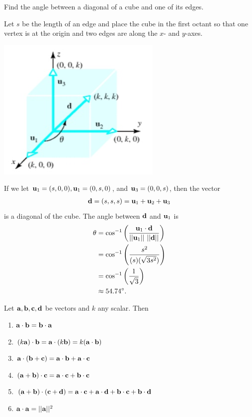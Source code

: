 \documentclass[12pt,letterpaper,reqno]{article}
\numberwithin{equation}{section}
\begin{document}
\begin{example}
	Find the angle between a diagonal of a cube and one of its edges.
\end{example}

{\color{red} 
Let $s$ be the length of an edge and place the cube in the first octant so that one vertex is at the origin and two edges are along the $x$- and $y$-axes.
\begin{center}
	\includegraphics[scale=0.5]{figures_mvc/cube_coordinates}
\end{center}
If we let ${\bf u}_1=(s,0,0), {\bf u}_1=(0,s,0)$, and ${\bf u}_3=(0,0,s)$, then the vector
\begin{align*}
	{\bf d}=(s,s,s)={\bf u}_1+{\bf u}_2+{\bf u}_3
\end{align*}
is a diagonal of the cube. The angle between ${\bf d}$ and ${\bf u}_1$ is 
\begin{align*}
	\theta &=\cos^{-1}\left(\frac{{\bf u}_1 \cdot {\bf d}}{||{\bf u}_1 || \ || {\bf d}||}\right) \\
	&=\cos^{-1}\left(\frac{s^2}{(s)(\sqrt{3s^2})}\right)  \\
	&=\cos^{-1}\left(\frac{1}{\sqrt{3}}\right) \\
	&\approx 54.74^\circ.
\end{align*}
}
\newpage
\begin{prop}\label{prop:dot}
	Let ${\bf a}, {\bf b}, {\bf c}, {\bf d}$ be vectors and $k$ any scalar. Then 
	\begin{enumerate}[(1)]
		\item ${\bf a}\cdot {\bf b}={\bf b} \cdot {\bf a}$
		\item $(k {\bf a})\cdot {\bf b}={\bf a}\cdot (k{\bf b})=k({\bf a}\cdot {\bf b})$
		\item ${\bf a}\cdot ({\bf b}+{\bf c})={\bf a}\cdot {\bf b}+{\bf a}\cdot {\bf c}$
		\item $({\bf a}+{\bf b})\cdot {\bf c}={\bf a}\cdot {\bf c}+{\bf b}\cdot {\bf c}$
		\item $({\bf a}+{\bf b})\cdot ({\bf c}+{\bf d})={\bf a}\cdot {\bf c}+{\bf a}\cdot {\bf d}+{\bf b}\cdot {\bf c}+{\bf b}\cdot {\bf d}$
		\item ${\bf a} \cdot {\bf a}=||{\bf a}||^2$
	\end{enumerate}
\end{prop}
\end{document}
